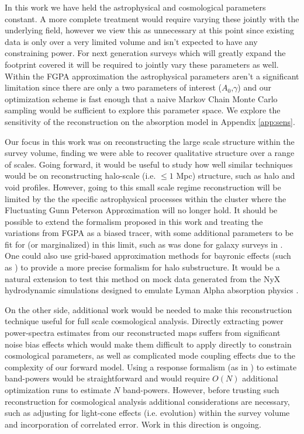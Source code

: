 \documentclass[times]{aastex62}
\begin{document}
In this work we have held the astrophysical and cosmological parameters constant. A more complete treatment would require varying these jointly with the underlying field, however we view this as unnecessary at this point since existing data is only over a very limited volume and isn't expected to have any constraining power. For next generation surveys which will greatly expand the footprint covered it will be required to jointly vary these parameters as well. Within the FGPA approximation the astrophysical parameters aren't a significant limitation since there are only a two parameters of interest ($A_0$,$\gamma$) and our optimization scheme is fast enough that a naive Markov Chain Monte Carlo sampling would be sufficient to explore this parameter space. We explore the sensitivity of the reconstruction on the absorption model in Appendix \ref{app:sens}.

Our focus in this work was on reconstructing the large scale structure within the survey volume, finding we were able to recover qualitative structure over a range of scales. Going forward, it would be useful to study how well similar techniques would be on reconstructing halo-scale (i.e.  $\leq 1$ Mpc) structure, such as halo and void profiles. However, going to this small scale regime reconstruction will be limited by the the specific astrophysical processes within the cluster where the Fluctuating Gunn Peterson Approximation will no longer hold. It should be possible to extend the formalism proposed in this work and treating the variations from FGPA as a biased tracer, with some additional parameters to be fit for (or marginalized) in this limit, such as was done for galaxy surveys in \cite{2015ata,2016Kitaura,2018BORG}. One could also use grid-based approximation methods for bayronic effects (such as \cite{2018Dai}) to provide a more precise formalism for halo substructure. It would be a natural extension to test this method on mock data generated from the NyX hydrodynamic simulations designed to emulate Lyman Alpha absorption physics \cite{2013nyx,2015nyxlya}.

On the other side, additional work would be needed to make this reconstruction technique useful for full scale cosmological analysis. Directly extracting power power-spectra estimates from our reconstructed maps suffers from significant noise bias effects which would make them difficult to apply directly to constrain cosmological parameters, as well as complicated mode coupling effects due to the complexity of our forward model. Using a response formalism (as in \cite{seljak2017towards,2018Horowitz,2018fengseljakzaldarriaga}) to estimate band-powers would be straightforward and would require $O(N)$ additional optimization runs to estimate $N$ band-powers. However, before trusting such reconstruction for cosmological analysis additional considerations are necessary, such as adjusting for light-cone effects (i.e. evolution) within the survey volume and incorporation of correlated error. Work in this direction is ongoing.
\end{document}
